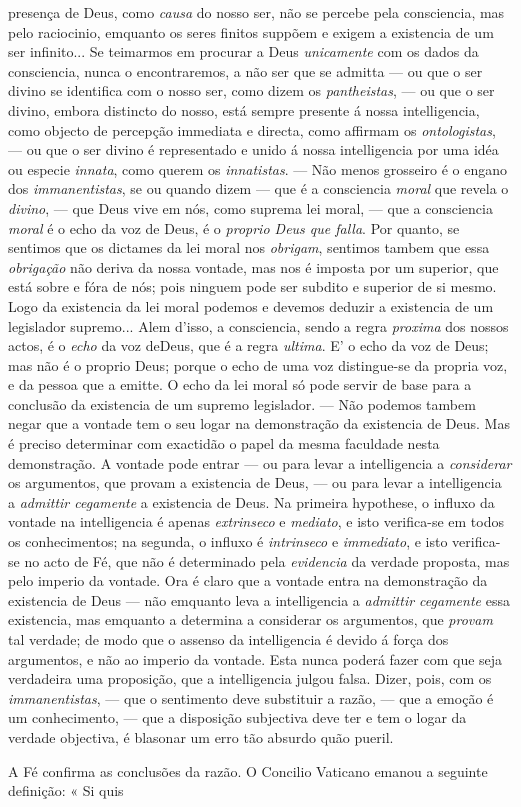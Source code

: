 presença de Deus, como \emph{causa} do nosso ser, não se percebe pela consciencia, mas pelo raciocinio, emquanto os seres finitos suppõem e exigem a existencia de um ser infinito... Se teimarmos em procurar a Deus \emph{unicamente} com os dados da consciencia, nunca o encontraremos, a não ser que se admitta --- ou que o ser divino se identifica com o nosso ser, como dizem os \emph{pantheistas}, --- ou que o ser divino, embora distincto do nosso, está sempre presente á nossa intelligencia, como objecto de percepção immediata e directa, como affirmam os \emph{ontologistas}, --- ou que o ser divino é representado e unido á nossa intelligencia por uma idéa ou especie \emph{innata}, como querem os \emph{innatistas}. --- Não menos grosseiro é o engano dos \emph{immanentistas}, se ou quando dizem --- que é a consciencia \emph{moral} que revela o \emph{divino}, --- que Deus vive em nós, como suprema lei moral, --- que a consciencia \emph{moral} é o echo da voz de Deus, é o \emph{proprio Deus que falla}. Por quanto, se sentimos que os dictames da lei moral nos \emph{obrigam}, sentimos tambem que essa \emph{obrigação} não deriva da nossa vontade, mas nos é imposta por um superior, que está sobre e fóra de nós; pois ninguem pode ser subdito e superior de si mesmo. Logo da existencia da lei moral podemos e devemos deduzir a existencia de um legislador supremo... Alem d'isso, a consciencia, sendo a regra \emph{proxima} dos nossos actos, é o \emph{echo} da voz deDeus, que é a regra \emph{ultima}. E' o echo da voz de Deus; mas não é o proprio Deus; porque o echo de uma voz distingue-se da propria voz, e da pessoa que a emitte. O echo da lei moral só pode servir de base para a conclusão da existencia de um supremo legislador. --- Não podemos tambem negar que a vontade tem o seu logar na demonstração da existencia de Deus. Mas é preciso determinar com exactidão o papel da mesma faculdade nesta demonstração. A vontade pode entrar --- ou para levar a intelligencia a \emph{considerar} os argumentos, que provam a existencia de Deus, --- ou para levar a intelligencia a \emph{admittir cegamente} a existencia de Deus. Na primeira hypothese, o influxo da vontade na intelligencia é apenas \emph{extrinseco} e \emph{mediato}, e isto verifica-se em todos os conhecimentos; na segunda, o influxo é \emph{intrinseco} e \emph{immediato}, e isto verifica-se no acto de Fé, que não é determinado pela \emph{evidencia} da verdade proposta, mas pelo imperio da vontade. Ora é claro que a vontade entra na demonstração da existencia de Deus --- não emquanto leva a intelligencia a \emph{admittir cegamente} essa existencia, mas emquanto a determina a considerar os argumentos, que \emph{provam} tal verdade; de modo que o assenso da intelligencia é devido á força dos argumentos, e não ao imperio da vontade. Esta nunca poderá fazer com que seja verdadeira uma proposição, que a intelligencia julgou falsa. Dizer, pois, com os \emph{immanentistas}, --- que o sentimento deve substituir a razão, --- que a emoção é um conhecimento, --- que a disposição subjectiva deve ter e tem o logar da verdade objectiva, é blasonar um erro tão absurdo quão pueril.\par A Fé confirma as conclusões da razão. O Concilio Vaticano emanou a seguinte definição: « Si quis 